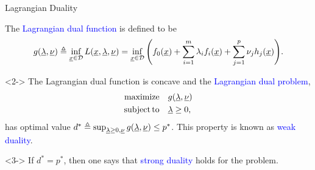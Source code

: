\documentclass[10pt,english,aspectratio=169]{beamer}
\begin{document}
\begin{frame}{Lagrangian Duality}

\begin{definition}
The \textcolor{blue}{Lagrangian dual function} is defined to be \vspace{-1.5mm}
\[ g(\underline{\lambda},\underline{\nu}) \triangleq \inf_{\underline{x}\in \mathcal{D}} L(\underline{x},\underline{\lambda},\underline{\nu}) = \inf_{\underline{x}\in \mathcal{D}} \Bigg( f_0(\underline{x}) + \sum_{i=1}^m \lambda_i f_i(\underline{x}) + \sum_{j=1}^p \nu_j h_j(\underline{x}) \Bigg). \]
\end{definition}



\begin{lemma}<2->
The Lagrangian dual function is concave and the \textcolor{blue}{Lagrangian dual problem}, \vspace{-2.5mm}
\begin{align*}
\mathrm{maximize} \quad & g(\vecnot{\lambda},\vecnot{\nu}) \\
\mathrm{subject\,to} \quad & \vecnot{\lambda} \geq 0, \vspace{-1mm}
\end{align*}
has optimal value $d^*\triangleq\sup_{\underline{\lambda}\geq0,\underline{\nu}}g(\underline{\lambda},\underline{\nu})\leq p^*$.
This property is known as \textcolor{blue}{weak duality}.
\end{lemma}

\begin{definition}<3->
If $d^* = p^*$, then one says that \textcolor{blue}{strong duality} holds for the problem.
\end{definition}


\end{frame}
\end{document}
